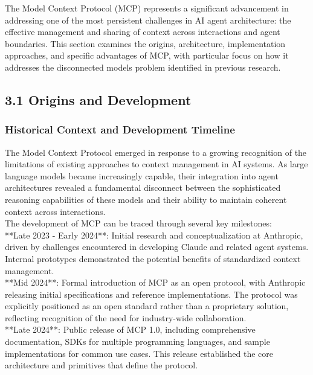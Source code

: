 The Model Context Protocol (MCP) represents a significant advancement in addressing one of the most persistent challenges in AI agent architecture: the effective management and sharing of context across interactions and agent boundaries. This section examines the origins, architecture, implementation approaches, and specific advantages of MCP, with particular focus on how it addresses the disconnected models problem identified in previous research.\\
\subsection{3.1 Origins and Development}
\subsubsection{Historical Context and Development Timeline}
The Model Context Protocol emerged in response to a growing recognition of the limitations of existing approaches to context management in AI systems. As large language models became increasingly capable, their integration into agent architectures revealed a fundamental disconnect between the sophisticated reasoning capabilities of these models and their ability to maintain coherent context across interactions.\\ \newline
The development of MCP can be traced through several key milestones:\\ \newline
**Late 2023 - Early 2024**: Initial research and conceptualization at Anthropic, driven by challenges encountered in developing Claude and related agent systems. Internal prototypes demonstrated the potential benefits of standardized context management.\\ \newline
**Mid 2024**: Formal introduction of MCP as an open protocol, with Anthropic releasing initial specifications and reference implementations. The protocol was explicitly positioned as an open standard rather than a proprietary solution, reflecting recognition of the need for industry-wide collaboration.\\ \newline
**Late 2024**: Public release of MCP 1.0, including comprehensive documentation, SDKs for multiple programming languages, and sample implementations for common use cases. This release established the core architecture and primitives that define the protocol.\\ \newline
